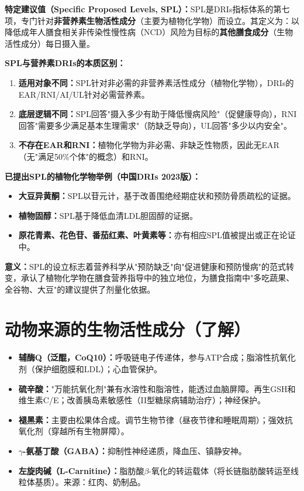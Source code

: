 \begin{keybox}
\textbf{特定建议值（Specific Proposed Levels, SPL）：}SPL是DRIs指标体系的第七项，专门针对\textbf{非营养素生物活性成分}（主要为植物化学物）而设立。其定义为：以降低成年人膳食相关非传染性慢性病（NCD）风险为目标的\textbf{其他膳食成分}（生物活性成分）每日摄入量。%

\textbf{SPL与营养素DRIs的本质区别：}
\begin{enumerate}[leftmargin=*]
    \item \textbf{适用对象不同：}SPL针对非必需的非营养素活性成分（植物化学物），DRIs的EAR/RNI/AI/UL针对必需营养素。
    \item \textbf{底层逻辑不同：}SPL回答"摄入多少有助于降低慢病风险"（促健康导向），RNI回答"需要多少满足基本生理需求"（防缺乏导向），UL回答"多少以内安全"。
    \item \textbf{不存在EAR和RNI：}植物化学物为非必需、非缺乏性物质，因此无EAR（无"满足50\%个体"的概念）和RNI。
\end{enumerate}

\textbf{已提出SPL的植物化学物举例（中国DRIs 2023版）：}
\begin{itemize}[leftmargin=*]
    \item \textbf{大豆异黄酮：}SPL以苷元计，基于改善围绝经期症状和预防骨质疏松的证据。
    \item \textbf{植物固醇：}SPL基于降低血清LDL胆固醇的证据。
    \item \textbf{原花青素、花色苷、番茄红素、叶黄素等：}亦有相应SPL值被提出或正在论证中。
\end{itemize}

\textbf{意义：}SPL的设立标志着营养科学从"预防缺乏"向"促进健康和预防慢病"的范式转变，承认了植物化学物在膳食营养指导中的独立地位，为膳食指南中"多吃蔬果、全谷物、大豆"的建议提供了剂量化依据。
\end{keybox}

\section{动物来源的生物活性成分（了解）}

\begin{itemize}[leftmargin=*]
    \item \textbf{辅酶Q（泛醌，CoQ10）：}呼吸链电子传递体，参与ATP合成；脂溶性抗氧化剂（保护细胞膜和LDL）；心血管保护。
    \item \textbf{硫辛酸：}"万能抗氧化剂"兼有水溶性和脂溶性，能透过血脑屏障。再生GSH和维生素C/E；改善胰岛素敏感性（II型糖尿病辅助治疗）；神经保护。
    \item \textbf{褪黑素：}主要由松果体合成。调节生物节律（昼夜节律和睡眠周期）；强效抗氧化剂（穿越所有生物屏障）。
    \item \textbf{$\gamma$-氨基丁酸（GABA）：}抑制性神经递质，降血压、镇静安神。
    \item \textbf{左旋肉碱（L-Carnitine）：}脂肪酸$\beta$-氧化的转运载体（将长链脂肪酸转运至线粒体基质）。来源：红肉、奶制品。
\end{itemize}

